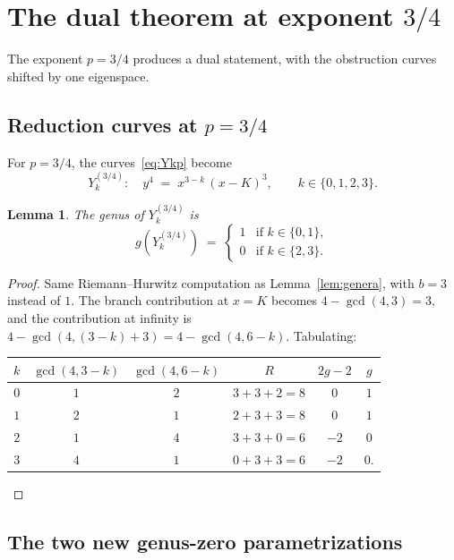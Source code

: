 \documentclass[11pt,a4paper]{article}
\theoremstyle{plain}
\newtheorem{lemma}[theorem]{Lemma}
\theoremstyle{definition}
\theoremstyle{remark}
\begin{document}
\section{The dual theorem at exponent \texorpdfstring{$3/4$}{3/4}}\label{sec:p34}

The exponent $p = 3/4$ produces a dual statement, with the obstruction curves shifted by one eigenspace.

\subsection*{Reduction curves at $p = 3/4$}

For $p = 3/4$, the curves~\eqref{eq:Ykp} become
\[
  Y_k^{(3/4)}\colon \quad y^4 \;=\; x^{3-k}\,(x - K)^3, \qquad k \in \{0, 1, 2, 3\}.
\]

\begin{lemma}\label{lem:genera-34}
The genus of $Y_k^{(3/4)}$ is
\[
  g(Y_k^{(3/4)}) \;=\; \begin{cases} 1 & \text{if } k \in \{0, 1\}, \\ 0 & \text{if } k \in \{2, 3\}. \end{cases}
\]
\end{lemma}

\begin{proof}
Same Riemann--Hurwitz computation as Lemma~\ref{lem:genera}, with $b = 3$ instead of $1$. The branch contribution at $x = K$ becomes $4 - \gcd(4, 3) = 3$, and the contribution at infinity is $4 - \gcd(4, (3-k)+3) = 4 - \gcd(4, 6-k)$. Tabulating:
\begin{center}
\begin{tabular}{c|ccc|cc}
$k$ & $\gcd(4, 3-k)$ & $\gcd(4, 6-k)$ & $R$ & $2g-2$ & $g$ \\
\hline
$0$ & $1$ & $2$ & $3 + 3 + 2 = 8$ & $0$ & $1$ \\
$1$ & $2$ & $1$ & $2 + 3 + 3 = 8$ & $0$ & $1$ \\
$2$ & $1$ & $4$ & $3 + 3 + 0 = 6$ & $-2$ & $0$ \\
$3$ & $4$ & $1$ & $0 + 3 + 3 = 6$ & $-2$ & $0$. \qedhere
\end{tabular}
\end{center}
\end{proof}

\subsection*{The two new genus-zero parametrizations}
\end{document}
